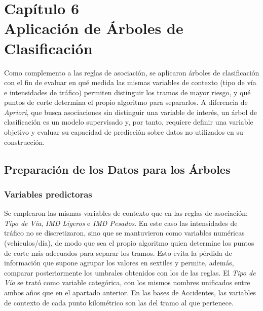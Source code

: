 \documentclass[twoside,a4paper,12pt,onecolumn,openany]{book}
\begin{document}

\setcounter{chapter}{6}
\chapter*{Capítulo 6 \\ \vspace{1cm} Aplicación de Árboles de Clasificación}
 
\setcounter{section}{0}
\setcounter{subsection}{0}
\setcounter{figure}{0}\setcounter{table}{0}
 
Como complemento a las reglas de asociación, se aplicaron árboles de clasificación con el fin de evaluar en qué medida las mismas variables de contexto (tipo de vía e intensidades de tráfico) permiten distinguir los tramos de mayor riesgo, y qué puntos de corte determina el propio algoritmo para separarlos. A diferencia de \textit{Apriori}, que busca asociaciones sin distinguir una variable de interés, un árbol de clasificación es un modelo supervisado y, por tanto, requiere definir una variable objetivo y evaluar su capacidad de predicción sobre datos no utilizados en su construcción.
 
\section{Preparación de los Datos para los Árboles}
 
\subsection{Variables predictoras}
 
Se emplearon las mismas variables de contexto que en las reglas de asociación: \textit{Tipo de Vía}, \textit{IMD Ligeros} e \textit{IMD Pesados}. En este caso las intensidades de tráfico no se discretizaron, sino que se mantuvieron como variables numéricas (vehículos/día), de modo que sea el propio algoritmo quien determine los puntos de corte más adecuados para separar los tramos. Esto evita la pérdida de información que supone agrupar los valores en sextiles y permite, además, comparar posteriormente los umbrales obtenidos con los de las reglas. El \textit{Tipo de Vía} se trató como variable categórica, con los mismos nombres unificados entre ambos años que en el apartado anterior. En las bases de Accidentes, las variables de contexto de cada punto kilométrico son las del tramo al que pertenece.
 
\end{document}
